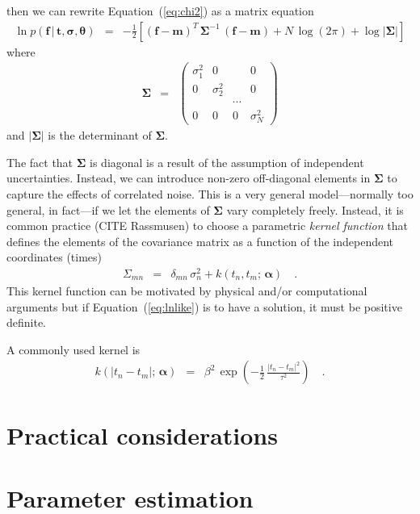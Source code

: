 \documentclass[12pt,preprint]{aastex}
\newcommand{\Eq}[1]{Equation~(\ref{eq:#1})}
\newcommand{\eq}[1]{\Eq{#1}}
\newcommand{\eqlabel}[1]{\label{eq:#1}}
\newcommand{\sectlabel}[1]{\label{sect:#1}}
\newcommand{\bvec}[1]{{\ensuremath{\boldsymbol{#1}}}}
\begin{document}
then we can rewrite \eq{chi2} as a matrix equation
\begin{eqnarray}\eqlabel{lnlike}
\ln p(\bvec{f}\,|\,\bvec{t},\bvec{\sigma},\bvec{\theta}) &=&
-\frac{1}{2}\left [
    (\bvec{f}-\bvec{m})^T\,\bvec{\Sigma}^{-1}\,(\bvec{f}-\bvec{m})
        + N\,\log (2\pi) + \log |\bvec{\Sigma}|
\right ]
\end{eqnarray}
where
\begin{eqnarray}
\bvec{\Sigma} &=& \left (\begin{array}{cccc}
\sigma_1^2 & 0 & & 0 \\
0 & \sigma_2^2 & & 0 \\
& & \cdots & \\
0 & 0 & 0 & \sigma_N^2
\end{array}\right )
\end{eqnarray}
and $|\bvec{\Sigma}|$ is the determinant of $\bvec{\Sigma}$.

The fact that $\bvec{\Sigma}$ is diagonal is a result of the assumption of
independent uncertainties.
Instead, we can introduce non-zero off-diagonal elements in $\bvec{\Sigma}$ to
capture the effects of correlated noise.
This is a very general model---normally too general, in fact---if we let the
elements of $\bvec{\Sigma}$ vary completely freely.
Instead, it is common practice (CITE Rassmusen) to choose a parametric
\emph{kernel function} that defines the elements of the covariance matrix as a
function of the independent coordinates (times)
\begin{eqnarray}
\Sigma_{mn} &=& \delta_{mn}\,\sigma_n^2 + k(t_n,t_m;\,\bvec{\alpha})\quad.
\end{eqnarray}
This kernel function can be motivated by physical and/or computational
arguments but if \eq{lnlike} is to have a solution, it must be positive
definite.

A commonly used kernel is
\begin{eqnarray}
k(|t_n-t_m|;\,\bvec{\alpha}) &=&
\beta^2 \, \exp \left ( -\frac{1}{2}\,\frac{|t_n-t_m|^2}{\tau^2} \right )
\quad.
\end{eqnarray}

\section{Practical considerations}\sectlabel{practical}

\section{Parameter estimation}\sectlabel{parameters}
\end{document}
